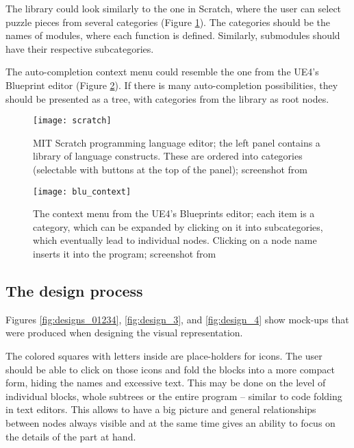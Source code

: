 The library could look similarly to the one in Scratch, where the user can select puzzle pieces from several categories (Figure \ref{fig:scratch2}). The categories should be the names of modules, where each function is defined. Similarly, submodules should have their respective subcategories.

The auto-completion context menu could resemble the one from the UE4's Blueprint editor (Figure \ref{fig:blu_context}). If there is many auto-completion possibilities, they should be presented as a tree, with categories from the library as root nodes.

\begin{figure}[h!]
\centering \texttt{[image: scratch]}
\caption{
    MIT Scratch programming language editor;
    the left panel contains a library of language constructs. These are ordered into categories (selectable with buttons at the top of the panel);
    screenshot from\protect\cite{fig_scratch}
}
\label{fig:scratch2}
\end{figure}

\begin{figure}[h!]
\centering \texttt{[image: blu\_context]}
\caption{
    The context menu from the UE4's Blueprints editor;
    each item is a category, which can be expanded by clicking on it into subcategories, which eventually lead to individual nodes. Clicking on a node name inserts it into the program;
    screenshot from\protect\cite{fig_blu_context}
}
\label{fig:blu_context}
\end{figure}

\subsection{The design process}
Figures \ref{fig:designs_01234}, \ref{fig:design_3}, and \ref{fig:design_4} show mock-ups that were produced when designing the visual representation.

The colored squares with letters inside are place-holders for icons. The user should be able to click on those icons and fold the blocks into a more compact form, hiding the names and excessive text. This may be done on the level of individual blocks, whole subtrees or the entire program -- similar to code folding in text editors. This allows to have a big picture and general relationships between nodes always visible and at the same time gives an ability to focus on the details of the part at hand.

